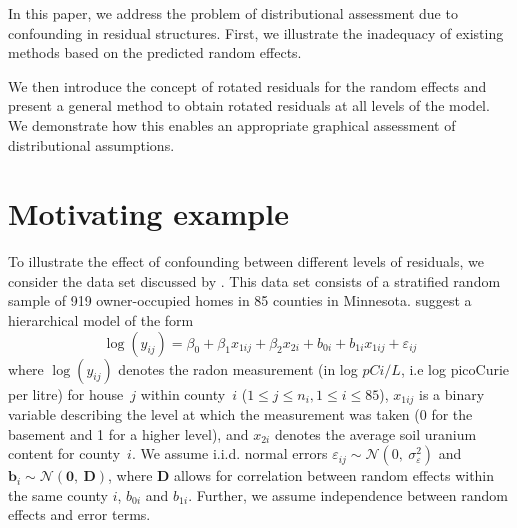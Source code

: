 \documentclass[12pt]{article} %
\newcommand{\al}[1]{{\color{red} #1}}
\begin{document}


In this paper, we address the problem of distributional assessment due to confounding in residual structures. 
First, we illustrate the inadequacy of existing methods based on the predicted random effects.

We then introduce  the concept of rotated residuals for the random effects and present a general method to obtain rotated residuals at all levels of the model. We demonstrate how this enables an appropriate graphical assessment  of distributional assumptions. %


\section{Motivating example}\label{sec:ex}
To illustrate the effect of confounding between different levels of residuals, we consider the data set discussed by
 \cite{Gelman:2006ue}. This data set consists of a stratified random sample of 919 owner-occupied homes in 85 counties in Minnesota.  \cite{Gelman:2006ue}  suggest a hierarchical model of the form
%
\begin{equation}\label{eq:radon}
  \log(y_{ij}) = \beta_0 + \beta_1 x_{1ij} + \beta_2 x_{2i} + b_{0i} + b_{1i} x_{1ij}  + \varepsilon_{ij}
\end{equation}
%
where   $\log(y_{ij})$ denotes the  radon measurement (in log $pCi/L$, i.e log picoCurie per litre) for house~$j$ within county~$i$ ($1 \le j \le n_i, 1 \le i \le 85$),
 $x_{1ij}$ is a binary variable describing the level at which the measurement was taken (0 for the basement and 1 for a higher level), and $x_{2i}$ denotes the average soil uranium content for  county~$i$. 
 We assume i.i.d. normal errors $\varepsilon_{ij} \sim \mathcal{N} (0,\ \sigma^2_{\varepsilon})$  and $\bm{b}_i \sim \mathcal{N}(\bm{0},\ \bm{D})$, where $\bm{D}$ allows for correlation between random effects within the same county $i$, $b_{0i}$ and $b_{1i}$. Further, we assume independence between random effects and error terms. 
\end{document}
